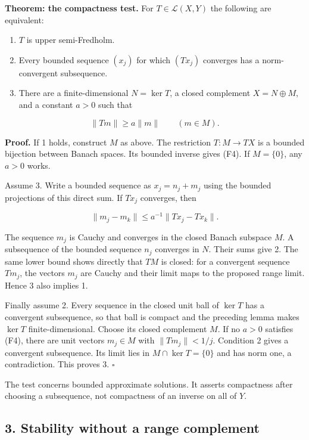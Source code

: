 \documentclass[
  11pt,
]{article}
\providecommand{\tightlist}{%
  \setlength{\itemsep}{0pt}\setlength{\parskip}{0pt}}
\begin{document}
\textbf{Theorem: the compactness test.} For \(T\in\mathcal L(X,Y)\) the
following are equivalent:

\begin{enumerate}
\def\labelenumi{\arabic{enumi}.}
\tightlist
\item
  \(T\) is upper semi-Fredholm.
\item
  Every bounded sequence \((x_j)\) for which \((Tx_j)\) converges has a
  norm-convergent subsequence.
\item
  There are a finite-dimensional \(N=\ker T\), a closed complement
  \(X=N\oplus M\), and a constant \(a>0\) such that
\end{enumerate}

\[
\|Tm\|\geq a\|m\|\qquad(m\in M).                              \tag{F4}
\]

\textbf{Proof.} If 1 holds, construct \(M\) as above. The restriction
\(T:M\to TX\) is a bounded bijection between Banach spaces. Its bounded
inverse gives (F4). If \(M=\{0\}\), any \(a>0\) works.

Assume 3. Write a bounded sequence as \(x_j=n_j+m_j\) using the bounded
projections of this direct sum. If \(Tx_j\) converges, then

\[
\|m_j-m_k\|\leq a^{-1}\|Tx_j-Tx_k\|.
\]

The sequence \(m_j\) is Cauchy and converges in the closed Banach
subspace \(M\). A subsequence of the bounded sequence \(n_j\) converges
in \(N\). Their sums give 2. The same lower bound shows directly that
\(TM\) is closed: for a convergent sequence \(Tm_j\), the vectors
\(m_j\) are Cauchy and their limit maps to the proposed range limit.
Hence 3 also implies 1.

Finally assume 2. Every sequence in the closed unit ball of \(\ker T\)
has a convergent subsequence, so that ball is compact and the preceding
lemma makes \(\ker T\) finite-dimensional. Choose its closed complement
\(M\). If no \(a>0\) satisfies (F4), there are unit vectors \(m_j\in M\)
with \(\|Tm_j\|<1/j\). Condition 2 gives a convergent subsequence. Its
limit lies in \(M\cap\ker T=\{0\}\) and has norm one, a contradiction.
This proves 3. \(\square\)

The test concerns bounded approximate solutions. It asserts compactness
after choosing a subsequence, not compactness of an inverse on all of
\(Y\).

\subsection{3. Stability without a range
complement}\label{stability-without-a-range-complement}
\end{document}
